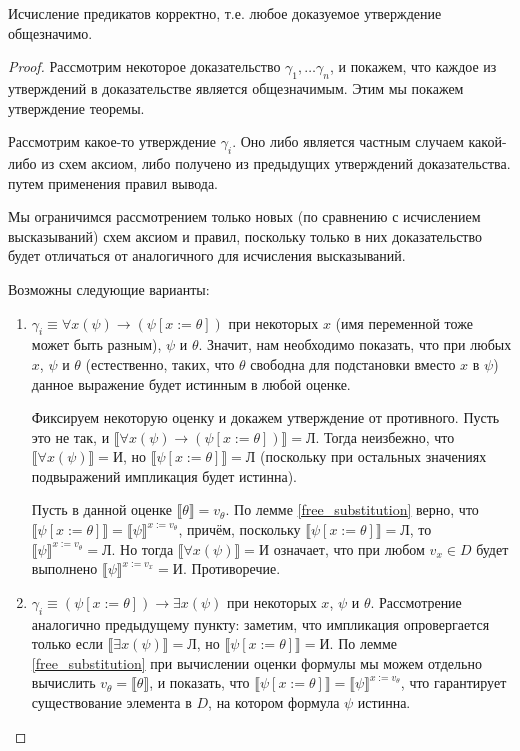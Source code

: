 \begin{theorem}
Исчисление предикатов корректно, т.е. любое доказуемое утверждение общезначимо.
\end{theorem}

\begin{proof}
Рассмотрим некоторое доказательство $\gamma_1, \dots \gamma_n$, и покажем, что
каждое из утверждений в доказательстве является общезначимым. Этим мы покажем 
утверждение теоремы.

Рассмотрим какое-то утверждение $\gamma_i$. Оно либо является частным случаем
какой-либо из схем аксиом, либо получено из предыдущих утверждений доказательства.
путем применения правил вывода.

Мы ограничимся рассмотрением только новых (по сравнению с исчислением высказываний)
схем аксиом и правил, поскольку только в них доказательство будет отличаться
от аналогичного для исчисления высказываний.

Возможны следующие варианты:
\begin{enumerate}
\item $\gamma_i \equiv \forall{x}(\psi) \rightarrow (\psi[x := \theta])$ при 
некоторых $x$ (имя переменной тоже может быть разным), $\psi$ и $\theta$. 
Значит, нам необходимо показать, что при любых $x$, $\psi$ и $\theta$ 
(естественно, таких, что $\theta$ свободна для подстановки вместо $x$ в $\psi$) 
данное выражение будет истинным в любой оценке.

Фиксируем некоторую оценку и докажем утверждение от противного. 
Пусть это не так, и 
$\llbracket \forall{x}(\psi)\rightarrow(\psi[x := \theta])\rrbracket = \texttt{Л}$.
Тогда неизбежно, что $\llbracket \forall{x}(\psi) \rrbracket = \texttt{И}$, но
$\llbracket \psi[x:=\theta] \rrbracket = \texttt{Л}$ (поскольку при остальных значениях
подвыражений импликация будет истинна). 

Пусть в данной оценке $\llbracket\theta\rrbracket=v_\theta$. 
По лемме \ref{free_substitution} верно, что 
$\llbracket \psi[x:=\theta] \rrbracket = \llbracket\psi\rrbracket^{x:=v_\theta}$,
причём, поскольку $\llbracket \psi[x:=\theta] \rrbracket = \texttt{Л}$, то
$\llbracket\psi\rrbracket^{x:=v_\theta} = \texttt{Л}$.
Но тогда $\llbracket \forall{x}(\psi) \rrbracket = \texttt{И}$ означает, что 
при любом $v_x \in D$ будет выполнено $\llbracket \psi \rrbracket^{x := v_x} = \texttt{И}$. 
Противоречие.

\item $\gamma_i \equiv (\psi[x := \theta]) \rightarrow \exists{x}(\psi)$ при некоторых
$x$, $\psi$ и $\theta$. Рассмотрение аналогично предыдущему пункту: заметим, что импликация
опровергается только если $\llbracket \exists{x}(\psi) \rrbracket = \texttt{Л}$, но
$\llbracket \psi[x:=\theta] \rrbracket = \texttt{И}$. По лемме 
\ref{free_substitution} при вычислении оценки формулы мы можем отдельно вычислить
$v_\theta = \llbracket\theta\rrbracket$, и показать, что 
$\llbracket \psi[x:=\theta] \rrbracket = \llbracket\psi\rrbracket^{x:=v_\theta}$, что 
гарантирует существование элемента в $D$, на котором формула $\psi$ истинна.


\end{enumerate}
\end{proof}

